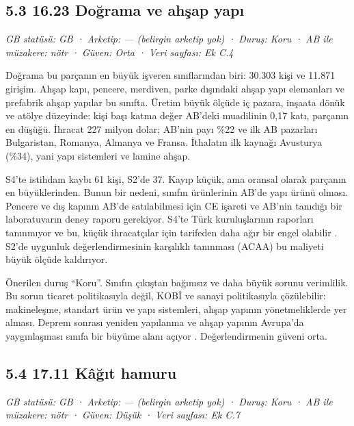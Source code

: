\hypertarget{nace_kartlar_16-18-53-1623-doux11frama-ve-ahux15fap-yapux131}{%
\subsection{5.3 16.23 Doğrama ve ahşap yapı}\label{nace_kartlar_16-18-53-1623-doux11frama-ve-ahux15fap-yapux131}}

\emph{GB statüsü: GB · Arketip: --- (belirgin arketip yok) · Duruş: Koru · AB ile müzakere: nötr · Güven: Orta · Veri sayfası: Ek C.4}

Doğrama bu parçanın en büyük işveren sınıflarından biri: 30.303 kişi ve 11.871 girişim. Ahşap kapı, pencere, merdiven, parke dışındaki ahşap yapı elemanları ve prefabrik ahşap yapılar bu sınıfta. Üretim büyük ölçüde iç pazara, inşaata dönük ve atölye düzeyinde: kişi başı katma değer AB'deki muadilinin 0,17 katı, parçanın en düşüğü. İhracat 227 milyon dolar; AB'nin payı \%22 ve ilk AB pazarları Bulgaristan, Romanya, Almanya ve Fransa. İthalatın ilk kaynağı Avusturya (\%34), yani yapı sistemleri ve lamine ahşap.

S4'te istihdam kaybı 61 kişi, S2'de 37. Kayıp küçük, ama oransal olarak parçanın en büyüklerinden. Bunun bir nedeni, sınıfın ürünlerinin AB'de yapı ürünü olması. Pencere ve dış kapının AB'de satılabilmesi için CE işareti ve AB'nin tanıdığı bir laboratuvarın deney raporu gerekiyor. S4'te Türk kuruluşlarının raporları tanınmıyor ve bu, küçük ihracatçılar için tarifeden daha ağır bir engel olabilir \etiketH{}. S2'de uygunluk değerlendirmesinin karşılıklı tanınması (ACAA) bu maliyeti büyük ölçüde kaldırıyor.

Önerilen duruş ``Koru''. Sınıfın çıkıştan bağımsız ve daha büyük sorunu verimlilik. Bu sorun ticaret politikasıyla değil, KOBİ ve sanayi politikasıyla çözülebilir: makineleşme, standart ürün ve yapı sistemleri, ahşap yapının yönetmeliklerde yer alması. Deprem sonrası yeniden yapılanma ve ahşap yapının Avrupa'da yaygınlaşması sınıfa bir büyüme alanı açıyor \etiketH{}. Değerlendirmenin güveni orta.

\hypertarget{nace_kartlar_16-18-54-1711-kuxe2ux11fux131t-hamuru}{%
\subsection{5.4 17.11 Kâğıt hamuru}\label{nace_kartlar_16-18-54-1711-kuxe2ux11fux131t-hamuru}}

\emph{GB statüsü: GB · Arketip: --- (belirgin arketip yok) · Duruş: Koru · AB ile müzakere: nötr · Güven: Düşük · Veri sayfası: Ek C.7}

